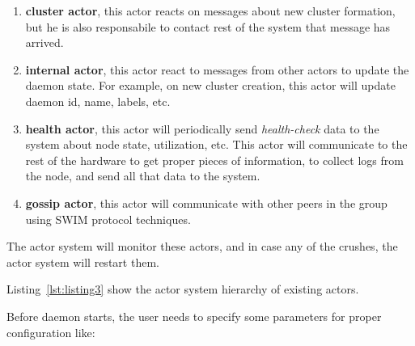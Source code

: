 \begin{enumerate}[start=1,label={(\bfseries \arabic*)}]
	\item \textbf{cluster actor}, this actor reacts on messages about new cluster formation, but he is also responsabile to contact rest of the system that message has arrived.
	\item \textbf{internal actor}, this actor react to messages from other actors to update the daemon state. For example, on new cluster creation, this actor will update daemon id, name, labels, etc.
	\item \textbf{health actor}, this actor will periodically send \emph{health-check} data to the system about node state, utilization, etc. This actor will communicate to the rest of the hardware to get proper pieces of information, to collect logs from the node, and send all that data to the system.
	\item \textbf{gossip actor}, this actor will communicate with other peers in the group using SWIM protocol techniques.
\end{enumerate}

\noindent
The actor system will monitor these actors, and in case any of the crushes, the actor system will restart them. 

Listing~\ref{lst:listing3} show the actor system hierarchy of existing actors.



\noindent
Before daemon starts, the user needs to specify some parameters for proper configuration like: 

